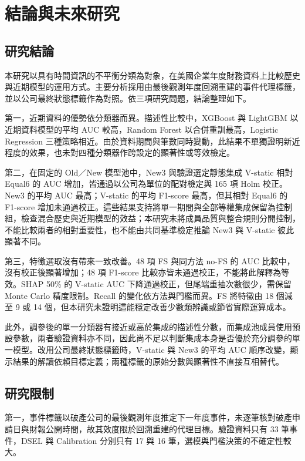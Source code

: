 \chapter{結論與未來研究}\label{chap:conclusion}
\begingroup
\setlength{\emergencystretch}{2em}

\section{研究結論}

本研究以具有時間資訊的不平衡分類為對象，在美國企業年度財務資料上比較歷史與近期模型的運用方式。主要分析採用由最後觀測年度回溯重建的事件代理標籤，並以公司最終狀態標籤作為對照。依三項研究問題，結論整理如下。

第一，近期資料的優勢依分類器而異。描述性比較中，XGBoost 與 LightGBM 以近期資料模型的平均 AUC 較高，Random Forest 以合併重訓最高，Logistic Regression 三種策略相近。由於資料期間與筆數同時變動，此結果不單獨證明新近程度的效果，也未對四種分類器作跨設定的顯著性或等效檢定。

第二，在固定的 Old／New 模型池中，New3 與驗證選定靜態集成 V-static 相對 Equal6 的 AUC 增加，皆通過以公司為單位的配對檢定與 165 項 Holm 校正。New3 的平均 AUC 最高；V-static 的平均 F1-score 最高，但其相對 Equal6 的 F1-score 增加未通過校正。這些結果支持將單一期間與全部等權集成保留為控制組，檢查混合歷史與近期模型的效益；本研究未將成員品質與整合規則分開控制，不能比較兩者的相對重要性，也不能由共同基準檢定推論 New3 與 V-static 彼此顯著不同。

第三，特徵選取沒有帶來一致改善。48 項 FS 與同方法 no-FS 的 AUC 比較中，沒有校正後顯著增加；48 項 F1-score 比較亦皆未通過校正，不能將此解釋為等效。SHAP 50\% 的 V-static AUC 下降通過校正，但尾端重抽次數很少，需保留 Monte Carlo 精度限制。Recall 的變化依方法與門檻而異。FS 將特徵由 18 個減至 9 或 14 個，但本研究未證明這能穩定改善少數類辨識或節省實際運算成本。

此外，調參後的單一分類器有接近或高於集成的描述性分數，而集成池成員使用預設參數，兩者驗證資料亦不同，因此尚不足以判斷集成本身是否優於充分調參的單一模型。改用公司最終狀態標籤時，V-static 與 New3 的平均 AUC 順序改變，顯示結果的解讀依賴目標定義；兩種標籤的原始分數與顯著性不直接互相替代。

\section{研究限制}

第一，事件標籤以破產公司的最後觀測年度推定下一年度事件，未逐筆核對破產申請日與財報公開時間，故其效度限於回溯重建的代理目標。驗證資料只有 33 筆事件，DSEL 與 Calibration 分別只有 17 與 16 筆，選模與門檻決策的不確定性較大。

